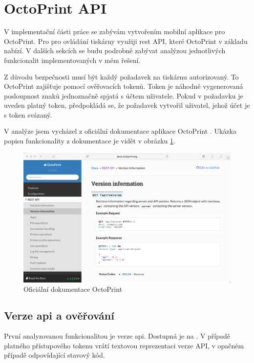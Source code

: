 \section{OctoPrint API}\label{analyza-api}

V implementační části práce se zabývám vytvořením mobilní aplikace pro OctoPrint.
Pro pro ovládání tiskárny využiji \acrshort{rest} API, které OctoPrint v základu nabízí.
V dalších sekcích se budu podrobně zabývat analýzou jednotlivých funkcionalit implementovaných v mém řešení.

Z důvodu bezpečnosti musí být každý požadavek na tiskárnu autorizovaný.
To OctoPrint zajišťuje pomocí ověřovacích tokenů.
Token je náhodně vygenerovaná posloupnost znaků jednoznačně spjatá s účtem uživatele.
Pokud v požadavku je uveden platný token, předpokládá se, že požadavek vytvořil uživatel, jehož účet je s token svázaný.

V analýze jsem vycházel z oficiální dokumentace aplikace OctoPrint \cite{octoprint-docs}.
Ukázka popisu funkcionality z dokumentace je vidět v obrázku \ref{fig:octoprint-docs}.

\begin{figure}\centering
	\includegraphics[width=\textwidth]{assets/analysis-octoprintapi-web.png}
	\caption{Oficiální dokumentace OctoPrint}\label{fig:octoprint-docs}
\end{figure}

\subsection{Verze \acrshort{api} a ověřování}

První analyzovanou funkcionalitou je verze \acrshort{api}.
Dostupná je na .
V případě platného přístupového tokenu vrátí textovou reprezentaci verze API, v opačném případě odpovídající stavový kód.

